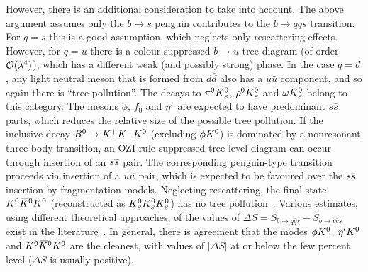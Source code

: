 However, there is an additional consideration to take into account.
The above argument assumes only the $b \to s$ penguin contributes
to the $b \to q\bar q s$ transition.
For $q = s$ this is a good assumption, which neglects only rescattering effects.
However, for $q = u$ there is a colour-suppressed $b \to u$ tree diagram
(of order ${\cal O}(\lambda^4)$), 
which has a different weak (and possibly strong) phase.
In the case $q = d$, any light neutral meson that is formed from $d \bar{d}$ 
also has a $u \bar{u}$ component, and so again there is ``tree pollution''. 
The \Bz decays to $\pi^0K^0_{\scriptscriptstyle S}$, $\rho^0K^0_{\scriptscriptstyle S}$ and $\omega K^0_{\scriptscriptstyle S}$ belong to this category.
The mesons $\phi$, $f_0$ and ${\eta^{\prime}}$ are expected to have predominant
$s\bar{s}$ parts, which reduces the relative size of the possible tree
pollution. 
If the inclusive decay $B^0\to K^+K^-K^0$ (excluding $\phi K^0$) is dominated by
a nonresonant three-body transition, 
an OZI-rule suppressed tree-level diagram can occur 
through insertion of an $s\overline s$ pair. 
The corresponding penguin-type transition 
proceeds via insertion of a $u\overline u$ pair, which is expected
to be favoured over the $s\overline s$ insertion by fragmentation models.
Neglecting rescattering, the final state $K^0\kern 0.2em\overline{\kern -0.2em K}{}^0K^0$ 
(reconstructed as $K^0_{\scriptscriptstyle S}K^0_{\scriptscriptstyle S}K^0_{\scriptscriptstyle S}$) has no tree pollution~\cite{Gershon:2004tk}.
Various estimates, using different theoretical approaches,
of the values of $\Delta S = S_{b \to q\bar q s} - S_{b \to c\bar c s}$
exist in the literature~\cite{Grossman:2003qp,Gronau:2003ep,Gronau:2003kx,Gronau:2004hp,Cheng:2005bg,Gronau:2005gz,Buchalla:2005us,Beneke:2005pu,Engelhard:2005hu,Cheng:2005ug,Engelhard:2005ky,Gronau:2006qh,Silvestrini:2007yf,Dutta:2008xw}.
In general, there is agreement that the modes
$\phi K^0$, ${\eta^{\prime}}K^0$ and $K^0\kern 0.2em\overline{\kern -0.2em K}{}^0K^0$ are the cleanest,
with values of $\left| \Delta S \right|$ at or below the few percent level 
($\Delta S$ is usually positive).

\label{sec:cp_uta:qqs:cp_eigen}

